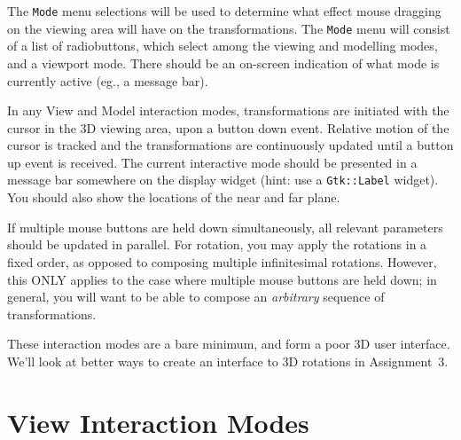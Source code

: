 The {\tt Mode} menu selections will be used to determine what effect
mouse dragging on the viewing area will have on the
transformations.  The {\tt Mode} menu will consist of a
list of radiobuttons, which select among the viewing and modelling
modes, and a viewport mode.  There should be an on-screen indication of what
mode is currently active (eg., a message bar).

In any View and Model interaction modes, transformations are initiated
with the cursor in the 3D viewing area, upon a button down event.
Relative motion of the cursor is tracked and the transformations are
continuously updated until a button up event is received.  The current
interactive mode should be presented in a message bar somewhere on the
display widget (hint: use a {\tt Gtk::Label} widget).  You should also
show the locations of the near and far plane.

If multiple mouse buttons are held down simultaneously, all
relevant parameters should be updated in parallel.  For rotation, you may
apply the rotations in a fixed order, as opposed to composing multiple
infinitesimal rotations.  However, this ONLY applies to the case where
multiple mouse buttons are held down; in general, you will want to be able to
compose an {\em arbitrary\/} sequence of transformations.

These interaction modes are a bare minimum, and form a poor
3D user interface.  We'll look at better ways to create an interface
to 3D rotations in Assignment~3.

\section{View Interaction Modes}

